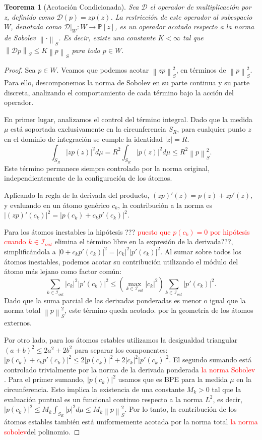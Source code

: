 \documentclass[12pt,a4paper]{article}
\newtheorem{teorema}{Teorema}
\newcommand{\Poly}{\mathbb{P}[z]}
\newcommand{\norm}[1]{\left\| #1 \right\|_S}
\newcommand{\D}{\mathcal{D}}
\begin{document}
\begin{teorema}[Acotación Condicionada]
Sea $\D$ el operador de multiplicación por z, definido como $\D(p) = z p(z)$. La restricción de este operador al subespacio $W$, denotada como $\D|_W : W \to \Poly$, es un operador acotado respecto a la norma de Sobolev $\norm{\cdot}$. Es decir, existe una constante $K < \infty$ tal que $\norm{\D p} \le K \norm{p}$ para todo $p \in W$.
\end{teorema}

\begin{proof}
Sea $p \in W$. Veamos que podemos acotar $\norm{zp}^2$, en términos de $\norm{p}^2$. Para ello, descomponemos la norma de Sobolev en su parte continua y su parte discreta, analizando el comportamiento de cada término bajo la acción del operador.

En primer lugar, analizamos el control del término integral. Dado que la medida $\mu$ está soportada exclusivamente en la circunferencia $S_R$, para cualquier punto $z$ en el dominio de integración se cumple la identidad $|z| = R$.
$$\int_{S_R} |z p(z)|^2 d\mu = R^2 \int_{S_R} |p(z)|^2 d\mu \le R^2 \norm{p}^2.$$
Este término permanece siempre controlado por la norma original, independientemente de la configuración de los átomos.

Aplicando la regla de la derivada del producto, $(zp)'(z) = p(z) + z p'(z)$, y evaluando en un átomo genérico $c_k$, la contribución a la norma es $|(zp)'(c_k)|^2 = |p(c_k) + c_k p'(c_k)|^2$.

Para los átomos inestables la hipótesis ??? \textcolor{red}{puesto que $p(c_k)=0$ por hipótesis cuando $k\in \mathcal{I}_{out}$} elimina el término libre en la expresión de la derivada???, simplificándola a $|0 + c_k p'(c_k)|^2 = |c_k|^2 |p'(c_k)|^2$. Al sumar sobre todos los átomos inestables, podemos acotar su contribución utilizando el módulo del átomo más lejano como factor común:
$$ \sum_{k \in \mathcal{I}_{out}}  |c_k|^2 |p'(c_k)|^2 \le \left( \max_{k \in \mathcal{I}_{out}} |c_k|^2 \right) \sum_{k \in \mathcal{I}_{out}}  |p'(c_k)|^2. $$
Dado que la suma parcial de las derivadas ponderadas es menor o igual que la norma total $\norm{p}^2$, este término queda acotado.  por la geometría de los átomos externos.

Por otro lado, para los átomos estables utilizamos la desigualdad triangular $(a+b)^2 \le 2a^2 + 2b^2$ para separar los componentes: $|p(c_k) + c_k p'(c_k)|^2 \le 2|p(c_k)|^2 + 2|c_k|^2 |p'(c_k)|^2$. El segundo sumando está controlado trivialmente por la norma de la derivada ponderada \textcolor{red}{la norma Sobolev}
. Para el primer sumando, $|p(c_k)|^2$ usamos que es BPE para la medida $\mu$ en la circunferencia. Esto implica la existencia de una constante $M_k > 0$ tal que la evaluación puntual es un funcional continuo respecto a la norma $L^2$, es decir, $|p(c_k)|^2 \le M_k \int_{S_R} |p|^2 d\mu \le M_k \norm{p}^2$. Por lo tanto, la contribución de los átomos estables también está uniformemente acotada por la norma total \textcolor{red}{la norma sobolev}del polinomio.


\end{proof}
\end{document}
